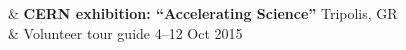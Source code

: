 %
\color{gray}{Volunteer work} & \textbf{CERN exhibition: ``Accelerating Science''} \hfill Tripolis, GR \\ 
& Volunteer tour guide \hfill 4--12 Oct 2015 \\
